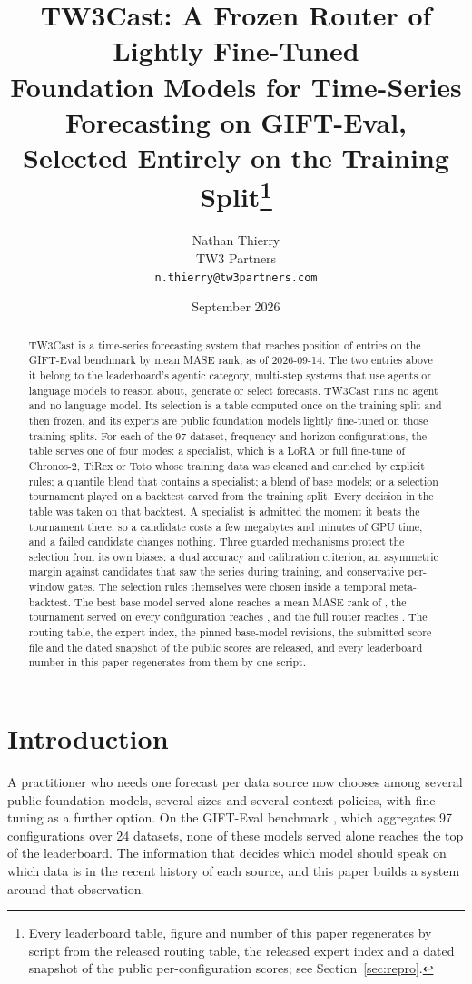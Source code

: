 \documentclass[11pt]{article}
\title{TW3Cast: A Frozen Router of Lightly Fine-Tuned\\
Foundation Models for Time-Series Forecasting on GIFT-Eval,\\
Selected Entirely on the Training Split\thanks{Every leaderboard table, figure and number of this paper regenerates by script from the
released routing table, the released expert index and a dated snapshot of
the public per-configuration scores; see Section~\ref{sec:repro}.}}
\author{Nathan Thierry\\
TW3 Partners\\
\texttt{n.thierry@tw3partners.com}}
\date{September 2026}
\begin{document}
\maketitle

\begin{abstract}
TW3Cast is a time-series forecasting system that reaches position
\ourPos{} of \nEntries{} entries on the GIFT-Eval benchmark by mean MASE
rank, as of 2026-09-14. The two entries above it belong to the leaderboard's agentic category,
multi-step systems that use agents or language models to reason about,
generate or select forecasts. TW3Cast runs no agent and no language
model. Its selection is a table computed once on the training split and
then frozen, and its experts are public foundation models lightly
fine-tuned on those training splits. For each of the 97 dataset,
frequency and horizon configurations, the table serves one of four modes:
a specialist, which is a LoRA or full fine-tune of Chronos-2, TiRex or
Toto whose training data was cleaned and enriched by explicit rules; a
quantile blend that contains a specialist; a blend of base models; or a
selection tournament played on a backtest carved from the training
split. Every decision in the table was taken on that
backtest. A specialist is admitted the moment it beats the tournament
there, so a candidate costs a few megabytes and minutes of GPU time, and a
failed candidate changes nothing. Three guarded mechanisms protect the
selection from its own biases: a dual accuracy and calibration criterion,
an asymmetric margin against candidates that saw the series during
training, and conservative per-window gates. The selection rules
themselves were chosen inside a temporal meta-backtest. The best base
model served alone reaches a mean MASE rank of \bestPoolRank, the
tournament served on every configuration reaches \tourOnlyRank, and the
full router reaches \ourRank. The routing table, the expert index, the
pinned base-model revisions, the submitted score file and the dated
snapshot of the public scores are released, and every leaderboard number in this paper regenerates from them by one script.
\end{abstract}

\section{Introduction}
\label{sec:intro}

A practitioner who needs one forecast per data source now chooses among
several public foundation models, several sizes and several context
policies, with fine-tuning as a further option. On the GIFT-Eval benchmark
\citep{aksu2024gifteval}, which aggregates 97 configurations over 24
datasets, none of these models served alone reaches the top of the
leaderboard. The information that decides which model should speak on which data is in the recent history of
each source, and this paper builds a system around that observation.
\end{document}
